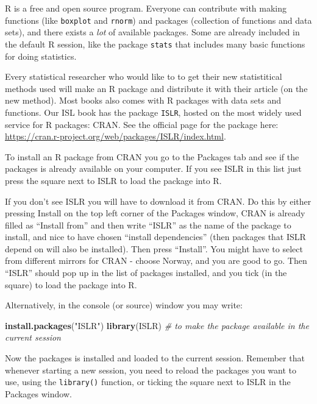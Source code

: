 \documentclass[]{article}
\newenvironment{Shaded}{\begin{snugshade}}{\end{snugshade}}
\newcommand{\KeywordTok}[1]{\textcolor[rgb]{0.13,0.29,0.53}{\textbf{#1}}}
\newcommand{\StringTok}[1]{\textcolor[rgb]{0.31,0.60,0.02}{#1}}
\newcommand{\CommentTok}[1]{\textcolor[rgb]{0.56,0.35,0.01}{\textit{#1}}}
\newcommand{\NormalTok}[1]{#1}
\begin{document}
R is a free and open source program. Everyone can contribute with making
functions (like \texttt{boxplot} and \texttt{rnorm}) and packages
(collection of functions and data sets), and there exists a \emph{lot}
of available packages. Some are already included in the default R
session, like the package \texttt{stats} that includes many basic
functions for doing statistics.

Every statistical researcher who would like to to get their new
statistitical methods used will make an R package and distribute it with
their article (on the new method). Most books also comes with R packages
with data sets and functions. Our ISL book has the package
\texttt{ISLR}, hosted on the most widely used service for R packages:
CRAN. See the official page for the package here:
\url{https://cran.r-project.org/web/packages/ISLR/index.html}.

To install an R package from CRAN you go to the Packages tab and see if
the packages is already available on your computer. If you see ISLR in
this list just press the square next to ISLR to load the package into R.

If you don't see ISLR you will have to download it from CRAN. Do this by
either pressing Install on the top left corner of the Packages window,
CRAN is already filled as ``Install from'' and then write ``ISLR'' as
the name of the package to install, and nice to have chosen ``install
dependencies'' (then packages that ISLR depend on will also be
installed). Then press ``Install''. You might have to select from
different mirrors for CRAN - choose Norway, and you are good to go. Then
``ISLR'' should pop up in the list of packages installed, and you tick
(in the square) to load the package into R.

Alternatively, in the console (or source) window you may write:

\begin{Shaded}
\begin{Highlighting}[]
\KeywordTok{install.packages}\NormalTok{(}\StringTok{"ISLR"}\NormalTok{)}
\KeywordTok{library}\NormalTok{(ISLR)  }\CommentTok{# to make the package available in the current session}
\end{Highlighting}
\end{Shaded}

Now the packages is installed and loaded to the current session.
Remember that whenever starting a new session, you need to reload the
packages you want to use, using the \texttt{library()} function, or
ticking the square next to ISLR in the Packages window.
\end{document}

